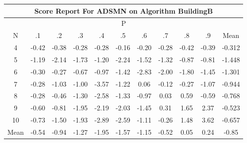 \documentclass[11pt,a4paper]{report}
\begin{document}
\begin{longtable}{ | c || c | c | c | c | c | c | c | c | c || c |}
\hline
\multicolumn{11}{|c|}{ Score Report For ADSMN on Algorithm BuildingB} \\
\hline
\multicolumn{11}{|c|}{ P } \\
\hline
N & .1 & .2 & .3 & .4 & .5 & .6 & .7 & .8 & .9 & Mean\\
 \hline
 \hline
 \endhead
  4 &  \cellcolor[HTML]{FFF7F7} -0.42 &  \cellcolor[HTML]{FFF7F7} -0.38 &  \cellcolor[HTML]{FFF7F7} -0.28 &  \cellcolor[HTML]{FFF7F7} -0.28 &  \cellcolor[HTML]{FFF7F7} -0.16 &  \cellcolor[HTML]{FFF7F7} -0.20 &  \cellcolor[HTML]{FFF7F7} -0.28 &  \cellcolor[HTML]{FFF7F7} -0.42 &  \cellcolor[HTML]{FFF7F7} -0.39 & -0.312 \\
  5 &  \cellcolor[HTML]{FFDFDF} -1.19 &  \cellcolor[HTML]{FFC7C7} -2.14 &  \cellcolor[HTML]{FFD7D7} -1.73 &  \cellcolor[HTML]{FFDFDF} -1.20 &  \cellcolor[HTML]{FFC7C7} -2.24 &  \cellcolor[HTML]{FFD7D7} -1.52 &  \cellcolor[HTML]{FFDFDF} -1.32 &  \cellcolor[HTML]{FFE7E7} -0.87 &  \cellcolor[HTML]{FFE7E7} -0.81 & -1.448 \\
  6 &  \cellcolor[HTML]{FFF7F7} -0.30 &  \cellcolor[HTML]{FFF7F7} -0.27 &  \cellcolor[HTML]{FFEFEF} -0.67 &  \cellcolor[HTML]{FFE7E7} -0.97 &  \cellcolor[HTML]{FFDFDF} -1.42 &  \cellcolor[HTML]{FFB7B7} -2.83 &  \cellcolor[HTML]{FFCFCF} -2.00 &  \cellcolor[HTML]{FFCFCF} -1.80 &  \cellcolor[HTML]{FFD7D7} -1.45 & -1.301 \\
  7 &  \cellcolor[HTML]{FFF7F7} -0.28 &  \cellcolor[HTML]{FFE7E7} -1.03 &  \cellcolor[HTML]{FFE7E7} -1.00 &  \cellcolor[HTML]{FFA7A7} -3.57 &  \cellcolor[HTML]{FFDFDF} -1.22 &  \cellcolor[HTML]{FFFFFF} 0.06 &  \cellcolor[HTML]{FFFFFF} -0.12 &  \cellcolor[HTML]{FFF7F7} -0.27 &  \cellcolor[HTML]{FFE7E7} -1.07 & -0.944 \\
  8 &  \cellcolor[HTML]{FFF7F7} -0.28 &  \cellcolor[HTML]{FFF7F7} -0.46 &  \cellcolor[HTML]{FFDFDF} -1.30 &  \cellcolor[HTML]{FFBFBF} -2.58 &  \cellcolor[HTML]{FFDFDF} -1.33 &  \cellcolor[HTML]{FFE7E7} -0.97 &  \cellcolor[HTML]{FFFFFF} 0.03 &  \cellcolor[HTML]{EFEFFF} 0.59 &  \cellcolor[HTML]{FFEFEF} -0.59 & -0.768 \\
  9 &  \cellcolor[HTML]{FFEFEF} -0.60 &  \cellcolor[HTML]{FFE7E7} -0.81 &  \cellcolor[HTML]{FFCFCF} -1.95 &  \cellcolor[HTML]{FFC7C7} -2.19 &  \cellcolor[HTML]{FFCFCF} -2.03 &  \cellcolor[HTML]{FFD7D7} -1.45 &  \cellcolor[HTML]{F7F7FF} 0.31 &  \cellcolor[HTML]{D7D7FF} 1.65 &  \cellcolor[HTML]{C7C7FF} 2.37 & -0.523 \\
  10 &  \cellcolor[HTML]{FFEFEF} -0.73 &  \cellcolor[HTML]{FFD7D7} -1.50 &  \cellcolor[HTML]{FFCFCF} -1.93 &  \cellcolor[HTML]{FFB7B7} -2.89 &  \cellcolor[HTML]{FFBFBF} -2.59 &  \cellcolor[HTML]{FFDFDF} -1.11 &  \cellcolor[HTML]{FFF7F7} -0.26 &  \cellcolor[HTML]{D7D7FF} 1.48 &  \cellcolor[HTML]{A7A7FF} 3.62 & -0.657 \\
 \hline
 \hline
Mean &  \cellcolor[HTML]{FFEFEF} -0.54 &  \cellcolor[HTML]{FFE7E7} -0.94 &  \cellcolor[HTML]{FFDFDF} -1.27 &  \cellcolor[HTML]{FFCFCF} -1.95 &  \cellcolor[HTML]{FFD7D7} -1.57 &  \cellcolor[HTML]{FFDFDF} -1.15 &  \cellcolor[HTML]{FFEFEF} -0.52 &  \cellcolor[HTML]{FFFFFF} 0.05 &  \cellcolor[HTML]{F7F7FF} 0.24 &  \cellcolor[HTML]{FFE7E7} -0.85
\end{longtable}
\end{document}
